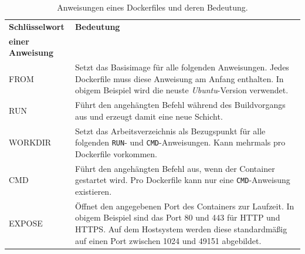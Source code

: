 \documentclass[../main.tex]{subfiles}
\begin{document}

			\vspace{0.5cm}
			\begin{table}[htp]
				\begin{centering}
				\begin{tabularx}{\textwidth}{>{\hsize=0.5\hsize}X|>{\hsize=1\hsize}X}
					\hline
					\textbf{Schlüsselwort} & \textbf{Bedeutung} \\
					\textbf{einer Anweisung} & \\
					\hline
					FROM
					& Setzt das Basisimage für alle folgenden Anweisungen. Jedes Dockerfile muss diese Anweisung am Anfang enthalten. In obigem Beispiel wird die neuste \emph{Ubuntu}-Version verwendet. \\
					\hline
					RUN
					& Führt den angehängten Befehl während des \gls{Build}vorgangs aus und erzeugt damit eine neue Schicht. \\
					\hline
					WORKDIR
					& Setzt das Arbeitsverzeichnis als Bezugspunkt für alle folgenden \texttt{RUN}- und \texttt{CMD}-Anweisungen. Kann mehrmals pro Dockerfile vorkommen. \\
					\hline
					CMD
					& Führt den angehängten Befehl aus, wenn der Container gestartet wird. Pro Dockerfile kann nur eine \texttt{CMD}-Anweisung existieren. \\
					\hline
					EXPOSE
					& Öffnet den angegebenen Port des Containers zur Laufzeit. In obigem Beispiel sind das Port 80 und 443 für \acrshort{HTTP} und \acrshort{HTTPS}. Auf dem Hostsystem werden diese standardmäßig auf einen Port zwischen 1024 und 49151 abgebildet. \\
					\hline
				\end{tabularx}
				\vspace{0.5cm}
				\caption{Anweisungen eines Dockerfiles und deren Bedeutung.}
				\label{tab:dockerfile}
				\end{centering}
			\end{table}
\end{document}
